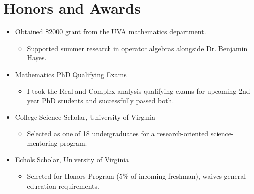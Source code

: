 \documentclass[12pt,letterpaper,sans]{moderncv}
\begin{document}
\section{Honors and Awards}
\begin{itemize}
  \item Obtained \$2000 grant from the UVA mathematics department.
  \begin{itemize}
    \item Supported summer research in operator algebras alongside Dr. Benjamin Hayes.
  \end{itemize}
  \item Mathematics PhD Qualifying Exams
  \begin{itemize}
    \item I took the Real and Complex analysis qualifying exams for upcoming 2nd year PhD students and successfully passed both.
  \end{itemize}
  \item College Science Scholar, University of Virginia
  \begin{itemize}
    \item Selected as one of 18 undergraduates for a research-oriented science-mentoring program.
  \end{itemize}


  \item Echols Scholar, University of Virginia
  \begin{itemize}
    \item Selected for Honors Program (5\% of incoming freshman), waives general education requirements.
  \end{itemize}
  
\end{itemize}
\end{document}
